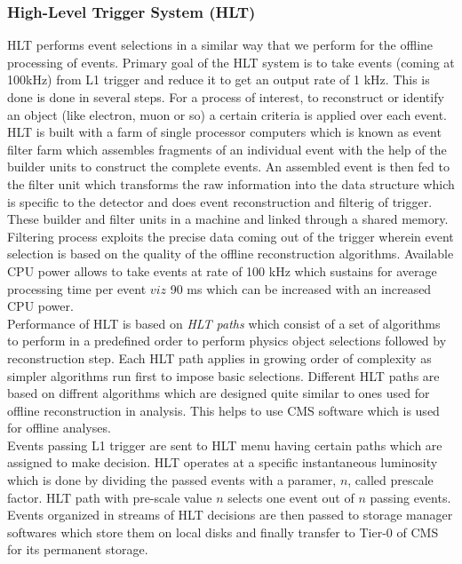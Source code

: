 \subsubsection{High-Level Trigger System (HLT)} \label{sec:hlt}
HLT performs event selections in a similar way that we perform for the offline processing of events.
Primary goal of the HLT system is to take events (coming at 100kHz) from L1 trigger and reduce it to get an output rate of 1 kHz. This is done is done in several steps.
For a process of interest, to reconstruct or identify an object (like electron, muon or so) a certain criteria is applied over each event.
HLT is built with a farm of single processor computers which is known as event filter farm which assembles fragments of an individual event with the help of the builder units to construct the complete events. An assembled event is then fed to the filter unit which transforms the raw information into the data structure which is specific to the detector and does event reconstruction and filterig of trigger. These builder and filter units in a machine and linked through a shared memory.
Filtering process exploits the precise data coming out of the trigger wherein event selection is based on the quality of the offline reconstruction algorithms. Available CPU power allows to take events at rate of 100 kHz which sustains for average processing time per event $viz$ 90 ms which can be increased with an increased CPU power.\\
Performance of HLT is based on \textit{HLT paths} which consist of a set of algorithms to perform in a predefined order to perform physics object selections followed by reconstruction step. Each HLT path applies in growing order of complexity as simpler algorithms run first to impose basic selections. Different HLT paths are based on diffrent algorithms which are designed quite similar to ones used for offline reconstruction in analysis. This helps to use CMS software which is used for offline analyses.\\
Events passing L1 trigger are sent to HLT menu having certain paths which are assigned to make decision.
HLT operates at a specific instantaneous luminosity which is done by dividing the passed events with a paramer, $n$, called prescale factor. HLT path with pre-scale value $n$ selects one event out of $n$ passing events. Events organized in streams of HLT decisions are then passed to storage manager softwares which store them on local disks and finally transfer to Tier-0 of CMS for its permanent storage.  %

